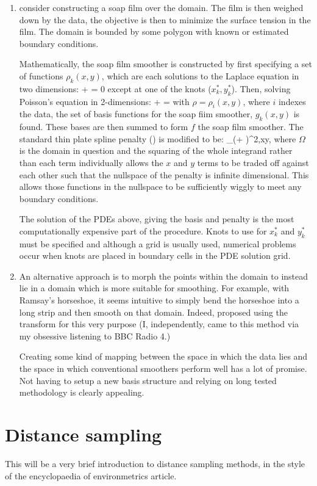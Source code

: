\begin{enumerate}
\item \cite{soap} consider constructing a soap film over the domain. The film is then weighed down by the data, the objective is then to minimize the surface tension in the film. The domain is bounded by some polygon with known or estimated boundary conditions.

Mathematically, the soap film smoother is constructed by first specifying a set of functions $\rho_k(x,y)$, which are each solutions to the Laplace equation in two dimensions:
\be
{} +  = 0
\ee
except at one of the knots ($x^*_k,y^*_k$). Then, solving Poisson's equation in 2-dimensions:
\be
{} +  = \rho
\ee
with $\rho=\rho_i(x,y)$, where $i$ indexes the data, the set of basis functions for the soap fiim smoother, $g_k(x,y)$ is found. These bases are then summed to form $f$ the soap film smoother. The standard thin plate spline penalty () is modified to be:
\be
\int_\Omega \Big(+ \Big)^2,xy,
\ee
where $\Omega$ is the domain in question and the squaring of the whole integrand rather than each term individually allows the $x$ and $y$ terms to be traded off against each other such that the nullspace of the penalty is infinite dimensional. This allows those functions in the nullspace to be sufficiently wiggly to meet any boundary conditions.

The solution of the PDEs above, giving the basis and penalty is the most computationally expensive part of the procedure. Knots to use for $x_k^*$ and $y_k^*$ must be specified and although a grid is usually used, numerical problems occur when knots are placed in boundary cells in the PDE solution grid.

\item An alternative approach is to morph the points within the domain to instead lie in a domain which is more suitable for smoothing. For example, with Ramsay's horseshoe, it seems intuitive to simply bend the horseshoe into a long strip and then smooth on that domain. Indeed, \cite{eilerstalk} proposed using the \sch transform for this very purpose (I, independently, came to this method via my obsessive listening to BBC Radio 4.)

Creating some kind of mapping between the space in which the data lies and the space in which conventional smoothers perform well has a lot of promise. Not having to setup a new basis structure and relying on long tested methodology is clearly appealing.

\end{enumerate}

\section{Distance sampling}

This will be a very brief introduction to distance sampling methods, in the style of the encyclopaedia of environmetrics article.
